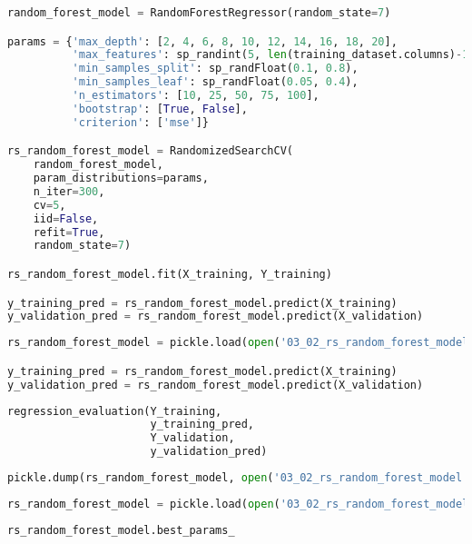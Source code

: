 \begin{lstlisting}[language=Python]
random_forest_model = RandomForestRegressor(random_state=7)

params = {'max_depth': [2, 4, 6, 8, 10, 12, 14, 16, 18, 20],
          'max_features': sp_randint(5, len(training_dataset.columns)-1),
          'min_samples_split': sp_randFloat(0.1, 0.8),
          'min_samples_leaf': sp_randFloat(0.05, 0.4),
          'n_estimators': [10, 25, 50, 75, 100],
          'bootstrap': [True, False],
          'criterion': ['mse']}

rs_random_forest_model = RandomizedSearchCV(
    random_forest_model,
    param_distributions=params,
    n_iter=300,
    cv=5,
    iid=False,
    refit=True,
    random_state=7)

rs_random_forest_model.fit(X_training, Y_training)

y_training_pred = rs_random_forest_model.predict(X_training)
y_validation_pred = rs_random_forest_model.predict(X_validation)
\end{lstlisting}

\begin{lstlisting}[language=Python]
rs_random_forest_model = pickle.load(open('03_02_rs_random_forest_model.pickle', 'rb'))

y_training_pred = rs_random_forest_model.predict(X_training)
y_validation_pred = rs_random_forest_model.predict(X_validation)
\end{lstlisting}

\begin{lstlisting}[language=Python]
regression_evaluation(Y_training,
                      y_training_pred,
                      Y_validation,
                      y_validation_pred)
\end{lstlisting}

\begin{lstlisting}[language=Python]
pickle.dump(rs_random_forest_model, open('03_02_rs_random_forest_model.pickle', 'wb'))
\end{lstlisting}

\begin{lstlisting}[language=Python]
rs_random_forest_model = pickle.load(open('03_02_rs_random_forest_model.pickle', 'rb'))
\end{lstlisting}

\begin{lstlisting}[language=Python]
rs_random_forest_model.best_params_
\end{lstlisting}

